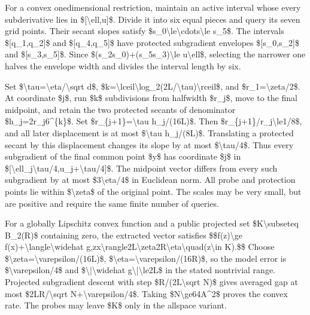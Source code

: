 \documentclass[10pt,a4paper]{article}
\begin{document}
For a convex onedimensional restriction, maintain an active interval whose every subderivative lies in \$[\textbackslash{}ell,u]\$. Divide it into six equal pieces and query its seven grid points. Their secant slopes satisfy \$s\_0\textbackslash{}le\textbackslash{}cdots\textbackslash{}le s\_5\$. The intervals \$[q\_1,q\_2]\$ and \$[q\_4,q\_5]\$ have protected subgradient envelopes \$[s\_0,s\_2]\$ and \$[s\_3,s\_5]\$. Since \$(s\_2s\_0)+(s\_5s\_3)\textbackslash{}le u\textbackslash{}ell\$, selecting the narrower one halves the envelope width and divides the interval length by six.

Set \$\textbackslash{}tau=\textbackslash{}eta/\textbackslash{}sqrt d\$, \$k=\textbackslash{}lceil\textbackslash{}log\_2(2L/\textbackslash{}tau)\textbackslash{}rceil\$, and \$r\_1=\textbackslash{}zeta/2\$. At coordinate \$j\$, run \$k\$ subdivisions from halfwidth \$r\_j\$, move to the final midpoint, and retain the two protected secants of denominator \$h\_j=2r\_j6\textasciicircum{}\{k\}\$. Set \$r\_\{j+1\}=\textbackslash{}tau h\_j/(16L)\$. Then \$r\_\{j+1\}/r\_j\textbackslash{}le1/8\$, and all later displacement is at most \$\textbackslash{}tau h\_j/(8L)\$. Translating a protected secant by this displacement changes its slope by at most \$\textbackslash{}tau/4\$. Thus every subgradient of the final common point \$y\$ has coordinate \$j\$ in \$[\textbackslash{}ell\_j\textbackslash{}tau/4,u\_j+\textbackslash{}tau/4]\$. The midpoint vector differs from every such subgradient by at most \$3\textbackslash{}eta/4\$ in Euclidean norm. All probe and protection points lie within \$\textbackslash{}zeta\$ of the original point. The scales may be very small, but are positive and require the same finite number of queries.

For a globally Lipschitz convex function and a public projected set \$K\textbackslash{}subseteq B\_2(R)\$ containing zero, the extracted vector satisfies
\$\$f(z)\textbackslash{}ge f(x)+\textbackslash{}langle\textbackslash{}widehat g,zx\textbackslash{}rangle2L\textbackslash{}zeta2R\textbackslash{}eta\textbackslash{}quad(z\textbackslash{}in K).\$\$
Choose \$\textbackslash{}zeta=\textbackslash{}varepsilon/(16L)\$, \$\textbackslash{}eta=\textbackslash{}varepsilon/(16R)\$, so the model error is \$\textbackslash{}varepsilon/4\$ and \$\textbackslash{}|\textbackslash{}widehat g\textbackslash{}|\textbackslash{}le2L\$ in the stated nontrivial range. Projected subgradient descent with step \$R/(2L\textbackslash{}sqrt N)\$ gives averaged gap at most \$2LR/\textbackslash{}sqrt N+\textbackslash{}varepsilon/4\$. Taking \$N\textbackslash{}ge64A\textasciicircum{}2\$ proves the convex rate. The probes may leave \$K\$ only in the allspace variant.
\end{document}
